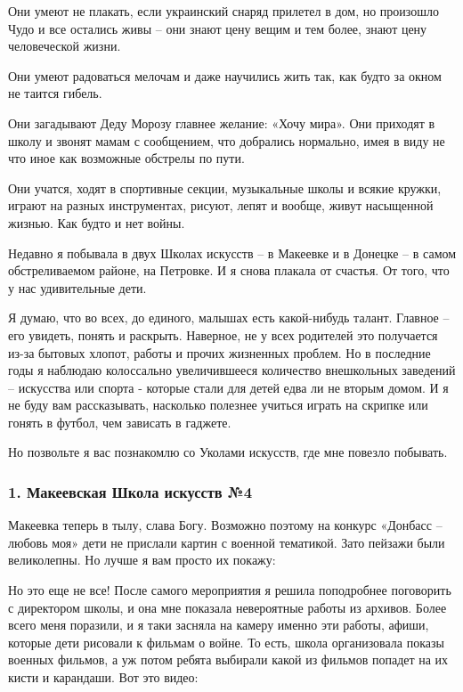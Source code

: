 Они умеют не плакать, если украинский снаряд прилетел в дом, но произошло Чудо
и все остались живы – они знают цену вещим и тем более, знают цену человеческой
жизни.

Они умеют радоваться мелочам и даже научились жить так, как будто за окном не
таится гибель.

Они загадывают Деду Морозу главнее желание: «Хочу мира». Они приходят в школу и
звонят мамам с сообщением, что добрались нормально, имея в виду не что иное как
возможные обстрелы по пути.

Они учатся, ходят в спортивные секции, музыкальные школы и всякие кружки,
играют на разных инструментах, рисуют, лепят и вообще, живут насыщенной жизнью.
Как будто и нет войны.

Недавно я побывала в двух Школах искусств – в Макеевке и в Донецке – в самом
обстреливаемом районе, на Петровке. И я снова плакала от счастья. От того, что
у нас удивительные дети.

Я думаю, что во всех, до единого, малышах есть какой-нибудь талант. Главное –
его увидеть, понять и раскрыть. Наверное, не у всех родителей это получается
из-за бытовых хлопот, работы и прочих жизненных проблем. Но в последние годы я
наблюдаю колоссально увеличившееся количество внешкольных заведений – искусства
или спорта - которые стали для детей едва ли не вторым домом. И я не буду вам
рассказывать, насколько полезнее учиться играть на скрипке или гонять в футбол,
чем зависать в гаджете.

Но позвольте я вас познакомлю со Уколами искусств, где мне повезло побывать.

\subsubsection{1. Макеевская Школа искусств №4}

Макеевка теперь в тылу, слава Богу. Возможно поэтому на конкурс «Донбасс –
любовь моя» дети не прислали картин с военной тематикой. Зато пейзажи были
великолепны. Но лучше я вам просто их покажу:


Но это еще не все! После самого мероприятия я решила поподробнее поговорить с
директором школы, и она мне показала невероятные работы из архивов. Более всего
меня поразили, и я таки засняла на камеру именно эти работы, афиши, которые
дети рисовали к фильмам о войне. То есть, школа организовала показы военных
фильмов, а уж потом ребята выбирали какой из фильмов попадет на их кисти и
карандаши. Вот это видео:

